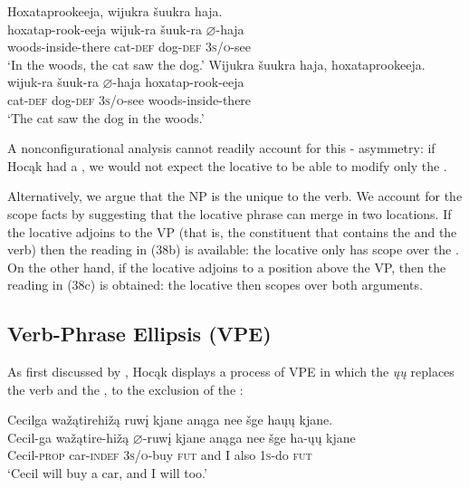 \documentclass[output=paper]{LSP/langsci}
\begin{document}
\begin{exe}
\ex\label{ex:jrs:39}
\begin{xlist}
\ex 
\glll Hoxataprookeeja, 		wijukra	\v{s}uukra			haja.\\
hoxatap-rook-eeja		wijuk-ra	\v{s}uuk-ra		$\varnothing$-haja \\
	woods-inside-there 	cat-\textsc{def}		dog-\textsc{def}		\textsc{3s/o}-see \\
\trans `In the woods, the cat saw the dog.'
\ex 
\glll Wijukra	\v{s}uukra			haja,				hoxataprookeeja.\\
wijuk-ra	\v{s}uuk-ra		$\varnothing$-haja			hoxatap-rook-eeja \\
	cat-\textsc{def}		dog-\textsc{def}		\textsc{3s/o}-see	woods-inside-there \\
\trans `The cat saw the dog in the woods.'
\end{xlist}
\end{exe}
	
 
A nonconfigurational analysis cannot readily account for this - asymmetry: if Hocąk had a , we would not expect the locative to be able to modify only the .
 
	
Alternatively, we argue that the  NP is the unique  to the verb. We account for the scope facts by suggesting that the locative phrase can merge in two locations. If the locative adjoins to the VP (that is, the constituent that contains the  and the verb) then the reading in (38b) is available: the locative only has scope over the . On the other hand, if the locative adjoins to a position above the VP, then the reading in (38c) is obtained: the locative then scopes over both arguments.

\subsection{Verb-Phrase Ellipsis (VPE)}

 
As first discussed by \citet{Johnson2013}, Hocąk displays a process of VPE in which the  \textit{\k{u}\k{u}} replaces the verb and the , to the exclusion of the  :
 

\begin{exe}
\ex\label{ex:jrs:40} 
\glll Cecilga	wa\v{z}ątirehi\v{z}ą		ruw\k{i}	kjane		anąga	nee		\v{s}ge		ha\k{u}\k{u}			kjane.\\
Cecil-ga	wa\v{z}ątire-hi\v{z}ą	$\varnothing$-ruw\k{i}		kjane		anąga	nee	\v{s}ge ha-\k{u}\k{u}		kjane \\
Cecil-\textsc{prop}		car-\textsc{indef}			\textsc{3s/o}-buy		\textsc{fut}	and	I	also	\textsc{1s}-do	\textsc{fut} \\
\trans `Cecil will buy a car, and I will too.'
\end{exe}
\end{document}
